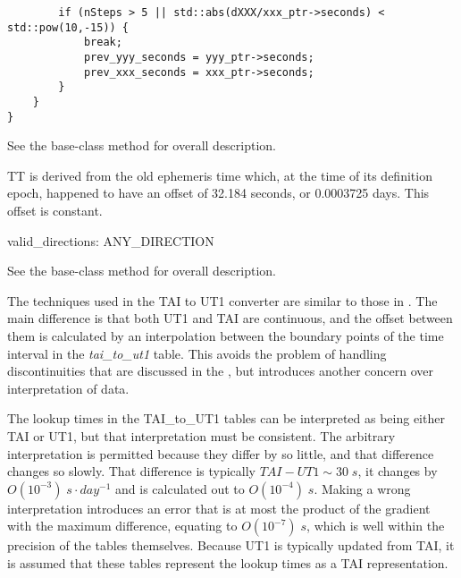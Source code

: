 {\begin{enumerate}
{\begin{enumerate}
\begin{verbatim}
		if (nSteps > 5 || std::abs(dXXX/xxx_ptr->seconds) < std::pow(10,-15)) {
			break;
			prev_yyy_seconds = yyy_ptr->seconds;
			prev_xxx_seconds = xxx_ptr->seconds;
		}
	}
}
\end{verbatim}

See the base-class  method
for overall description.


\end{enumerate}}


TT is derived from the old ephemeris time which, at the time of its
definition epoch, happened to have an offset of 32.184 seconds, or
0.0003725 days.  This offset is constant.

{\begin{enumerate}
valid\_directions:
ANY\_DIRECTION

See the base-class  method
for overall description.

\end{enumerate}}



The techniques used in the TAI to UT1 converter are similar to those in
.
The main difference is
that both UT1 and TAI are continuous, and the offset between them is
calculated by an interpolation between the boundary points of the time
interval in the \textit{tai\_to\_ut1 }table.  This avoids the problem
of handling discontinuities that are discussed in the
, but introduces another
concern over interpretation of data.

The lookup times in the TAI\_to\_UT1 tables can be interpreted as being
either TAI or UT1, but that interpretation must be consistent.  The
arbitrary interpretation is permitted because they differ by so little,
and that difference changes so slowly.  That difference is typically
$TAI-UT1 \sim 30 \; s$,
it changes by  $O(10^{-3}) \; s \cdot day^{-1}$ and is calculated out to
$O(10^{-4}) \; s$.  Making a wrong interpretation introduces an error that
is at most the product of the gradient with the maximum difference,
equating to  $O(10^{-7})\; s$, which is well within the precision of the
tables themselves.  Because UT1 is typically updated from TAI, it is
assumed that these tables represent the lookup times as a TAI
representation.


\end{enumerate}}
